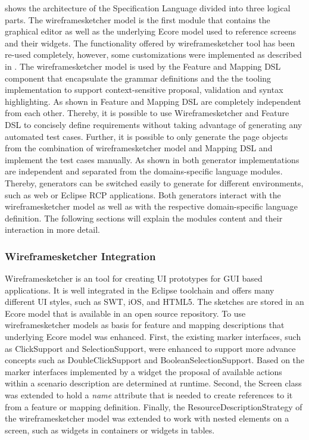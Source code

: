 \documentclass{sig-alternate-05-2015}
\begin{document}
{ shows the architecture of the Specification Language divided into three logical parts. 
The wireframesketcher model is the first module that contains the graphical editor as well as the underlying Ecore model used to reference screens and their widgets.
The functionality offered by wireframesketcher tool has been re-used completely, however, some customizations were implemented as described in .
The wireframesketcher model is used by the Feature and Mapping DSL component that encapsulate the grammar definitions and the the tooling implementation to support context-sensitive proposal, validation and syntax highlighting.
As shown in  Feature and Mapping DSL are completely independent from each other.
Thereby, it is possible to use Wireframesketcher and Feature DSL to concisely define requirements without taking advantage of generating any automated test cases.
Further, it is possible to only generate the page objects from the combination of wireframesketcher model and Mapping DSL and implement the test cases manually.
As shown in  both generator implementations are independent and separated from the domains-specific language modules.
Thereby, generators can be switched easily to generate for different environments, such as web or Eclipse RCP applications.
Both generators interact with the wireframesketcher model as well as with the respective domain-specific language definition.
The following sections will explain the modules content and their interaction in more detail.

\subsubsection{Wireframesketcher Integration}\label{sec:WireframesketcherIntegration} 
Wireframesketcher is an tool for creating UI prototypes for GUI based applications. 
It is well integrated in the Eclipse toolchain and offers many different UI styles, such as SWT, iOS, and HTML5.
The sketches are stored in an Ecore model that is available in an open source repository.
To use wireframesketcher models as basis for feature and mapping descriptions that underlying Ecore model was enhanced.
First, the existing marker interfaces, such as ClickSupport and SelectionSupport, were enhanced to support more advance concepts such as DoubleClickSupport and BooleanSelectionSupport.
Based on the marker interfaces implemented by a widget the proposal of available actions within a scenario description are determined at runtime.
Second, the Screen class was extended to hold a \textit{name} attribute that is needed to create references to it from a feature or mapping definition.
Finally, the ResourceDescriptionStrategy of the wireframesketcher model was extended to work with nested elements on a screen, such as widgets in containers or widgets in tables.

}
\end{document}
